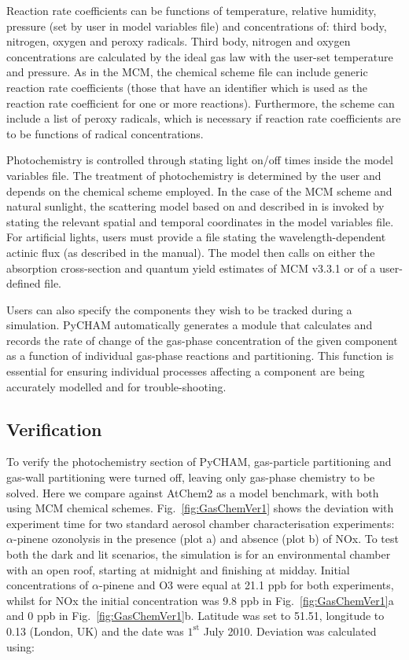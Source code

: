 \documentclass[gmd, manuscript]{copernicus}
\begin{document}
Reaction rate coefficients can be functions of temperature, relative humidity, pressure (set by user in model variables file) and concentrations of: third body, nitrogen, oxygen and peroxy radicals.  Third body, nitrogen and oxygen concentrations are calculated by the ideal gas law with the user-set temperature and pressure.  As in the MCM, the chemical scheme file can include generic reaction rate coefficients (those that have an identifier which is used as the reaction rate coefficient for one or more reactions).  Furthermore, the scheme can include a list of peroxy radicals, which is necessary if reaction rate coefficients are to be functions of radical concentrations.

Photochemistry is controlled through stating light on/off times inside the model variables file.  The treatment of photochemistry is determined by the user and depends on the chemical scheme employed.  In the case of the MCM scheme and natural sunlight, the scattering model based on \citet{Hayman1997} and described in \citet{Saunders2003} is invoked by stating the relevant spatial and temporal coordinates in the model variables file.  For artificial lights, users must provide a file stating the wavelength-dependent actinic flux (as described in the manual).  The model then calls on either the absorption cross-section and quantum yield estimates of MCM v3.3.1 or of a user-defined file.

Users can also specify the components they wish to be tracked during a simulation.  PyCHAM automatically generates a module that calculates and records the rate of change of the gas-phase concentration of the given component as a function of individual gas-phase reactions and partitioning.  This function is essential for ensuring individual processes affecting a component are being accurately modelled and for trouble-shooting.


\subsection{Verification}
To verify the photochemistry section of PyCHAM, gas-particle partitioning and gas-wall partitioning were turned off, leaving only gas-phase chemistry to be solved.  Here we compare against AtChem2 \citep{sommariva_acm2018} as a model benchmark, with both using MCM chemical schemes.  Fig.~\ref{fig:GasChemVer1} shows the deviation with experiment time for two standard aerosol chamber characterisation experiments: $\alpha$-pinene ozonolysis in the presence (plot a) and absence (plot b) of NOx.  To test both the dark and lit scenarios, the simulation is for an environmental chamber with an open roof, starting at midnight and finishing at midday.  Initial concentrations of $\alpha$-pinene and O3 were equal at 21.1 ppb for both experiments, whilst for NOx the initial concentration was 9.8 ppb in Fig.~\ref{fig:GasChemVer1}a and 0 ppb in Fig.~\ref{fig:GasChemVer1}b.  Latitude was set to 51.51, longitude to 0.13 (London, UK) and the date was $\mathrm{1^{st}}$ July 2010.  Deviation was calculated using:
\end{document}
